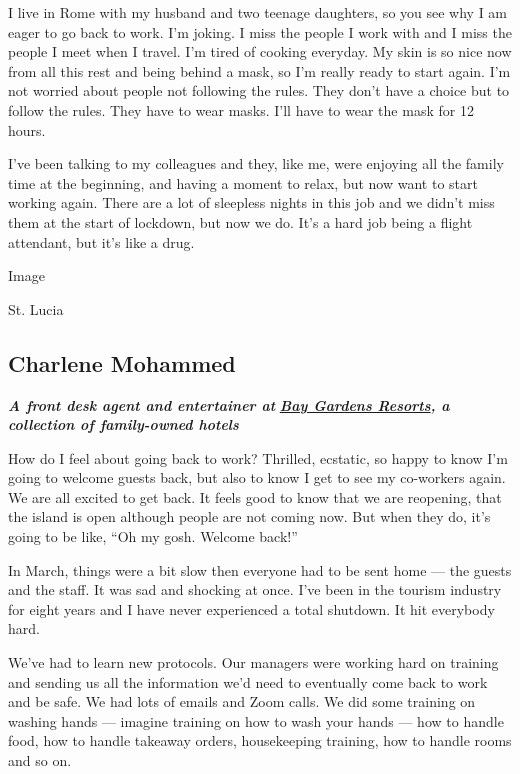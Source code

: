 I live in Rome with my husband and two teenage daughters, so you see why
I am eager to go back to work. I'm joking. I miss the people I work with
and I miss the people I meet when I travel. I'm tired of cooking
everyday. My skin is so nice now from all this rest and being behind a
mask, so I'm really ready to start again. I'm not worried about people
not following the rules. They don't have a choice but to follow the
rules. They have to wear masks. I'll have to wear the mask for 12 hours.

I've been talking to my colleagues and they, like me, were enjoying all
the family time at the beginning, and having a moment to relax, but now
want to start working again. There are a lot of sleepless nights in this
job and we didn't miss them at the start of lockdown, but now we do.
It's a hard job being a flight attendant, but it's like a drug.

Image

St. Lucia

\hypertarget{charlene-mohammed}{%
\subsection{Charlene Mohammed}\label{charlene-mohammed}}

\emph{\textbf{A front desk agent and entertainer at}}
\textbf{\href{https://www.baygardensresorts.com/}{\emph{Bay Gardens
Resorts}}\emph{, a collection of family-owned hotels}}

How do I feel about going back to work? Thrilled, ecstatic, so happy to
know I'm going to welcome guests back, but also to know I get to see my
co-workers again. We are all excited to get back. It feels good to know
that we are reopening, that the island is open although people are not
coming now. But when they do, it's going to be like, ``Oh my gosh.
Welcome back!''

In March, things were a bit slow then everyone had to be sent home ---
the guests and the staff. It was sad and shocking at once. I've been in
the tourism industry for eight years and I have never experienced a
total shutdown. It hit everybody hard.

We've had to learn new protocols. Our managers were working hard on
training and sending us all the information we'd need to eventually come
back to work and be safe. We had lots of emails and Zoom calls. We did
some training on washing hands --- imagine training on how to wash your
hands --- how to handle food, how to handle takeaway orders,
housekeeping training, how to handle rooms and so on.

